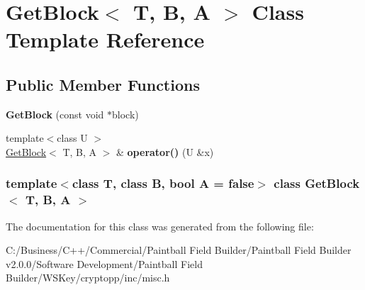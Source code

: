 \hypertarget{class_get_block}{
\section{GetBlock$<$ T, B, A $>$ Class Template Reference}
\label{class_get_block}
}
\subsection*{Public Member Functions}
\begin{DoxyCompactItemize}
\item 
\hypertarget{class_get_block_ae4df6476db27f481f43dd8229b6955a8}{
{\bfseries GetBlock} (const void $\ast$block)}
\label{class_get_block_ae4df6476db27f481f43dd8229b6955a8}

\item 
\hypertarget{class_get_block_ac977754b6bdb2a50533c882980093c3a}{
{\footnotesize template$<$class U $>$ }\\\hyperlink{class_get_block}{GetBlock}$<$ T, B, A $>$ \& {\bfseries operator()} (U \&x)}
\label{class_get_block_ac977754b6bdb2a50533c882980093c3a}

\end{DoxyCompactItemize}
\subsubsection*{template$<$class T, class B, bool A = false$>$ class GetBlock$<$ T, B, A $>$}



The documentation for this class was generated from the following file:\begin{DoxyCompactItemize}
\item 
C:/Business/C++/Commercial/Paintball Field Builder/Paintball Field Builder v2.0.0/Software Development/Paintball Field Builder/WSKey/cryptopp/inc/misc.h\end{DoxyCompactItemize}
